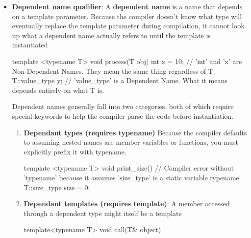\documentclass{report}
\begin{document}
\begin{itemize}
\begin{cppcode}
{                    forward_to_consume(name);                // Must print: lvalue
                    forward_to_consume(std::string{"Grace"}); // Must print: rvalue
                }
            \end{cppcode}
        \item \textbf{Dependent name qualifier}: A \textbf{dependent name} is a name that depends on a template parameter.
            \bigbreak \noindent 
            Because the compiler doesn't know what type will eventually replace the template parameter during compilation, it cannot look up what a dependent name actually refers to until the template is instantiated
            \bigbreak \noindent 
            \begin{cppcode}
                template <typename T>
                void process(T obj) {
                    int x = 10;        // 'int' and 'x' are Non-Dependent Names. They mean the same thing regardless of T.
                    T::value_type y;   // 'value_type' is a Dependent Name. What it means depends entirely on what T is.
                }
            \end{cppcode}
            \bigbreak \noindent 
            Dependent names generally fall into two categories, both of which require special keywords to help the compiler parse the code before instantiation.
            \bigbreak \noindent 
            \begin{enumerate}
                \item \textbf{Dependant types (requires typename)}
                    Because the compiler defaults to assuming nested names are member variables or functions, you must explicitly prefix it with typename.
                    \bigbreak \noindent 
                    \begin{cppcode}
                        template <typename T>
                        void print_size() {
                            // Compiler error without 'typename' because it assumes 'size_type' is a static variable
                            typename T::size_type size = 0; 
                        }
                    \end{cppcode}
                \item \textbf{Dependant templates (requires template)}: A member accessed through a dependent type might itself be a template
                    \bigbreak \noindent 
                    \begin{cppcode}
                        template<typename T>
                        void call(T& object) {
}
\end{cppcode}
\end{enumerate}
\end{itemize}
\end{document}
